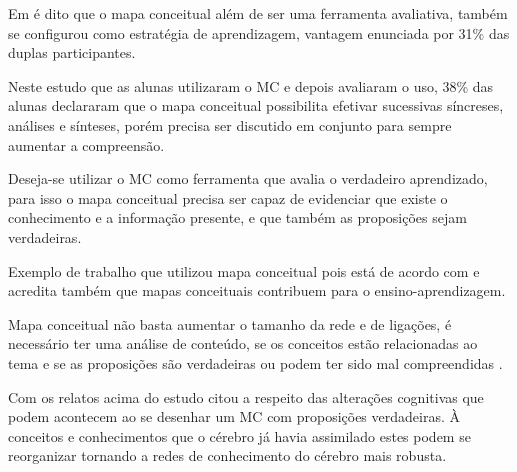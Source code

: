 Em \cite{vantagensDesvantagensMC} é dito que o mapa conceitual além de ser uma ferramenta avaliativa, também se configurou como estratégia de aprendizagem, vantagem enunciada por 31\% das duplas participantes.

Neste estudo \cite{vantagensDesvantagensMC} que as alunas utilizaram o MC e depois avaliaram o uso, 38\% das alunas declararam que o mapa conceitual possibilita efetivar sucessivas síncreses, análises e sínteses, porém precisa ser discutido em conjunto para sempre aumentar a compreensão.

Deseja-se utilizar o MC como ferramenta que avalia o verdadeiro aprendizado, para isso o mapa conceitual precisa ser capaz de evidenciar que existe o conhecimento e a informação presente, e que também as proposições sejam verdadeiras.

Exemplo de trabalho que utilizou mapa conceitual \cite{leiDeNewtonMC} pois está de acordo com \cite{novak} e acredita também que mapas conceituais contribuem para o ensino-aprendizagem.

Mapa conceitual não basta aumentar o tamanho da rede e de ligações, é necessário ter uma análise de conteúdo, se os conceitos estão relacionadas ao tema e se as proposições são verdadeiras ou podem ter sido mal compreendidas \cite{vantagensDesvantagensMC}.

Com os relatos acima do estudo \cite{vantagensDesvantagensMC} citou a respeito das alterações cognitivas que podem acontecem ao se desenhar um MC com proposições verdadeiras. À conceitos e conhecimentos que o cérebro já havia assimilado estes podem se reorganizar tornando a redes de conhecimento do cérebro mais robusta.
